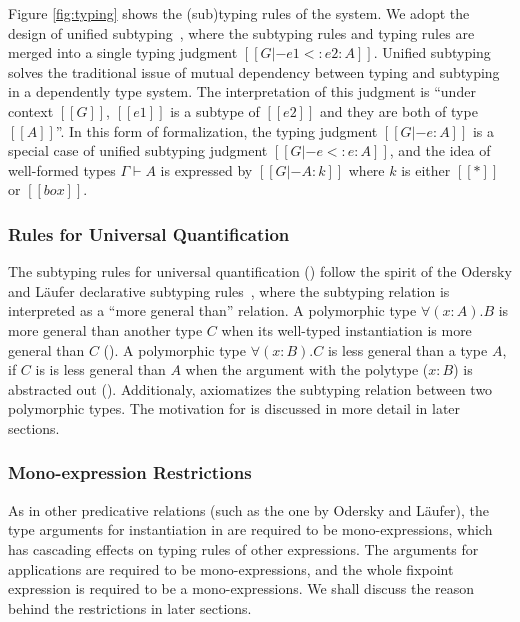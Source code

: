 Figure \ref{fig:typing} shows the (sub)typing rules of the system. We adopt the design
of unified subtyping~\cite{yang2017unifying}, where the subtyping rules and
typing rules are merged into a single typing judgment $[[G |- e1 <: e2 : A]]$.
Unified subtyping solves the traditional issue of mutual dependency between typing
and subtyping in a dependently type system.
The interpretation of this judgment is ``under context $[[G]]$, $[[e1]]$ is a
subtype of $[[e2]]$ and they are both of type $[[A]]$''.
In this form of formalization, the typing judgment $[[G |- e : A]]$ is a
special case of unified subtyping judgment $[[G |- e <: e : A]]$,
and the idea of well-formed types $\Gamma \vdash A$ is expressed by
$[[G |- A : k]]$ where $k$ is either $[[*]]$ or $[[box]]$.

\subsubsection{Rules for Universal Quantification}
The subtyping rules for universal quantification () follow
the spirit of the Odersky and L\"aufer declarative subtyping rules~\cite{oderskylaufer,DunfieldJoshua2013Caeb},
where the subtyping relation is interpreted as a ``more general than'' relation.
A polymorphic type $\forall (x:A). B$
is more general than another type $C$ when its well-typed
instantiation is more general than $C$ (). A polymorphic
type $\forall (x:B). C$ is less general than a type $A$,
if $C$ is is less general than $A$ when the argument with the polytype ($x:B$)
is abstracted out (). Additionaly, 
axiomatizes the subtyping relation between two polymorphic types.
The motivation for  is discussed in more detail in later sections.

\subsubsection{Mono-expression Restrictions}
As in other predicative relations (such as the one by Odersky and L\"aufer),
the type arguments for instantiation in  are
required to be mono-expressions, which has cascading effects on typing rules of
other expressions. The arguments for applications are required to be
mono-expressions, and the whole fixpoint expression is required to be a
mono-expressions. We shall
discuss the reason behind the restrictions in later sections.

